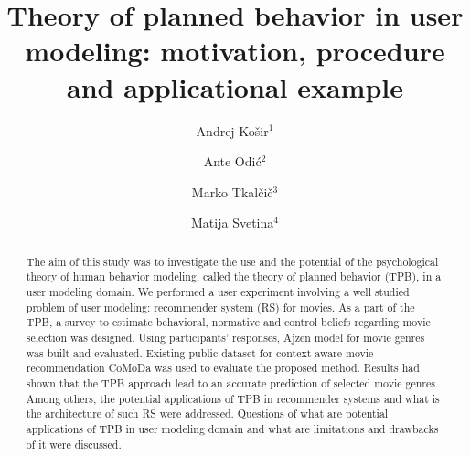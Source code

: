 \documentclass{llncs}
\begin{document}
\frontmatter  
{}
\mainmatter 

\title{Theory of planned behavior in user modeling: motivation, procedure and applicational example}

\author{Andrej Košir$^1$ \and Ante Odić$^2$ \and Marko Tkalčič$^3$ \and Matija Svetina$^4$}


  
\maketitle            

\begin{abstract}
The aim of this study was to investigate the use and the potential of the psychological theory of human behavior modeling, called the theory of planned behavior (TPB), in a user modeling domain. We performed a user experiment involving a well studied problem of user modeling: recommender system (RS) for movies. As a part of the TPB, a survey to estimate behavioral, normative and control beliefs regarding movie selection was designed. Using participants’ responses, Ajzen model for movie genres was built and evaluated. Existing public dataset for
context-aware movie recommendation CoMoDa was used to evaluate the proposed method. Results had shown that the TPB approach lead to an accurate prediction of selected movie genres. Among others, the potential
applications of TPB in recommender systems and what is the architecture of such RS were addressed. Questions of what are potential applications of TPB in user modeling domain and what are limitations and drawbacks of it were discussed. 
\end{abstract}
\end{document}
